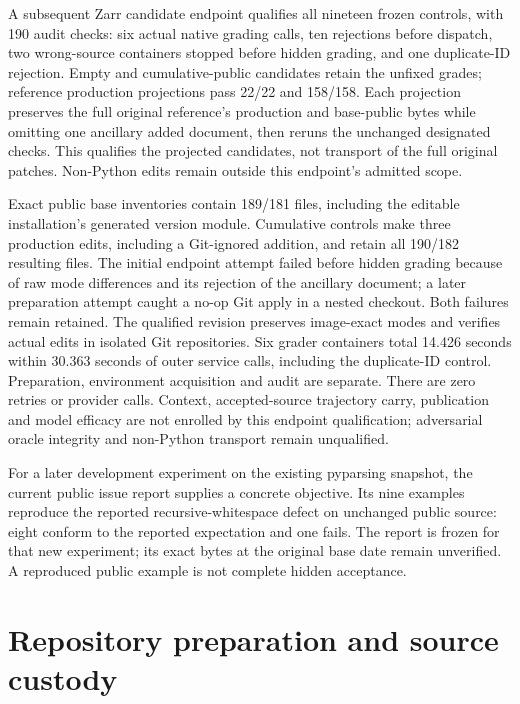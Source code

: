 A subsequent Zarr candidate endpoint qualifies all nineteen frozen controls,
with 190 audit checks: six actual native grading calls, ten rejections before
dispatch, two wrong-source containers stopped before hidden grading, and one
duplicate-ID rejection. Empty and cumulative-public candidates retain the
unfixed grades; reference production projections pass 22/22 and 158/158.
Each projection preserves the full original reference's production and
base-public bytes while omitting one ancillary added document, then reruns
the unchanged designated checks. This qualifies the projected candidates,
not transport of the full original patches. Non-Python edits remain outside
this endpoint's admitted scope.

Exact public base inventories contain 189/181 files, including the editable
installation's generated version module. Cumulative controls make three
production edits, including a Git-ignored addition, and retain all 190/182
resulting files. The initial endpoint attempt failed before hidden grading
because of raw mode differences and its rejection of the ancillary document;
a later preparation attempt caught a no-op Git apply in a nested checkout.
Both failures remain retained. The qualified revision preserves image-exact
modes and verifies actual edits in isolated Git repositories.
Six grader containers total 14.426 seconds within 30.363 seconds of outer
service calls, including the duplicate-ID control. Preparation, environment
acquisition and audit are separate. There are zero retries or provider calls.
Context, accepted-source trajectory carry, publication and model efficacy are
not enrolled by this endpoint qualification; adversarial oracle integrity
and non-Python transport remain unqualified.

For a later development experiment on the existing pyparsing snapshot, the
current public issue report supplies a concrete objective. Its nine examples
reproduce the reported recursive-whitespace defect on unchanged public source:
eight conform to the reported expectation and one fails. The report is frozen
for that new experiment; its exact bytes at the original base date remain
unverified. A reproduced public example is not complete hidden acceptance.

\section{Repository preparation and source custody}
\label{sec:incremental-context-preparation}
